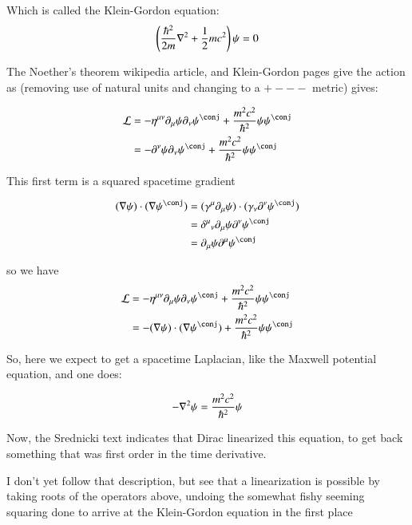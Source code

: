 \documentclass{article}
\begin{document}
Which is called the Klein-Gordon equation:
\begin{align*}
\left(\frac{\hbar^2}{2m} \nabla^2 + \frac{1}{2} m c^2\right) \psi = 0 \\
\end{align*}

The Noether's theorem wikipedia article, and Klein-Gordon pages give the action
as (removing use of natural units and changing to a $+---$ metric) gives:

\begin{align*}
\LL &= -\eta^{\mu\nu} \partial_\mu \psi \partial_\nu \psi^\conj + \frac{m^2 c^2}{\hbar^2} \psi \psi^\conj \\
&= -\partial^\nu \psi \partial_\nu \psi^\conj + \frac{m^2 c^2}{\hbar^2} \psi \psi^\conj \\
\end{align*}

This first term is a squared spacetime gradient

\begin{align*}
(\grad \psi) \cdot (\grad \psi^\conj) 
&= (\gamma^\mu \partial_\mu \psi) \cdot (\gamma_\nu \partial^\nu \psi^\conj) \\
&= {\delta^\mu}_\nu \partial_\mu \psi \partial^\nu \psi^\conj \\
&= \partial_\mu \psi \partial^\mu \psi^\conj \\
\end{align*}

so we have
\begin{align*}
\LL 
&= -\eta^{\mu\nu} \partial_\mu \psi \partial_\nu \psi^\conj + \frac{m^2 c^2}{\hbar^2} \psi \psi^\conj \\
&= -(\grad \psi) \cdot (\grad \psi^\conj) + \frac{m^2 c^2}{\hbar^2} \psi \psi^\conj \\
\end{align*}

So, here we expect to get a spacetime Laplacian, like the Maxwell potential equation, and one does:

\begin{align*}
-\nabla^2 \psi = \frac{m^2 c^2}{\hbar^2} \psi
\end{align*}

Now, the Srednicki text indicates that Dirac linearized this equation, to get back something that was
first order in the time derivative.

I don't yet follow that description, but see that a linearization is possible by taking roots of the operators above,
undoing the somewhat fishy seeming squaring done to arrive at the Klein-Gordon equation in the first place
\end{document}
